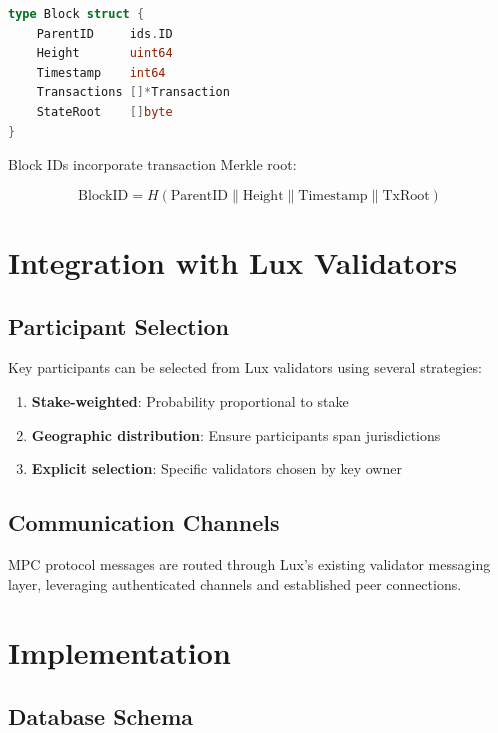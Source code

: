 \documentclass[11pt,twocolumn]{article}
\begin{document}
\begin{lstlisting}[language=Go,basicstyle=\ttfamily\small]
type Block struct {
    ParentID     ids.ID
    Height       uint64
    Timestamp    int64
    Transactions []*Transaction
    StateRoot    []byte
}
\end{lstlisting}

Block IDs incorporate transaction Merkle root:

\begin{equation}
\text{BlockID} = H(\text{ParentID} \| \text{Height} \| \text{Timestamp} \| \text{TxRoot})
\end{equation}

\section{Integration with Lux Validators}

\subsection{Participant Selection}

Key participants can be selected from Lux validators using several strategies:

\begin{enumerate}
\item \textbf{Stake-weighted}: Probability proportional to stake
\item \textbf{Geographic distribution}: Ensure participants span jurisdictions
\item \textbf{Explicit selection}: Specific validators chosen by key owner
\end{enumerate}

\subsection{Communication Channels}

MPC protocol messages are routed through Lux's existing validator messaging layer, leveraging authenticated channels and established peer connections.

\section{Implementation}

\subsection{Database Schema}
\end{document}
